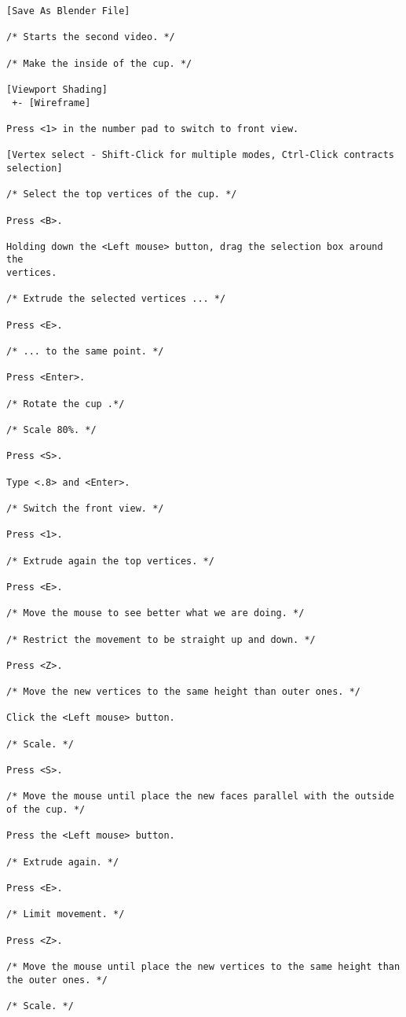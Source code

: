 \begin{verbatim}
[Save As Blender File]

/* Starts the second video. */

/* Make the inside of the cup. */

[Viewport Shading]
 +- [Wireframe]

Press <1> in the number pad to switch to front view.

[Vertex select - Shift-Click for multiple modes, Ctrl-Click contracts selection]

/* Select the top vertices of the cup. */

Press <B>.

Holding down the <Left mouse> button, drag the selection box around the
vertices.

/* Extrude the selected vertices ... */

Press <E>.

/* ... to the same point. */

Press <Enter>.

/* Rotate the cup .*/

/* Scale 80%. */

Press <S>.

Type <.8> and <Enter>.

/* Switch the front view. */

Press <1>.

/* Extrude again the top vertices. */

Press <E>.

/* Move the mouse to see better what we are doing. */

/* Restrict the movement to be straight up and down. */

Press <Z>.

/* Move the new vertices to the same height than outer ones. */

Click the <Left mouse> button.

/* Scale. */

Press <S>.

/* Move the mouse until place the new faces parallel with the outside
of the cup. */

Press the <Left mouse> button.

/* Extrude again. */

Press <E>.

/* Limit movement. */

Press <Z>.

/* Move the mouse until place the new vertices to the same height than
the outer ones. */

/* Scale. */


\end{verbatim}
